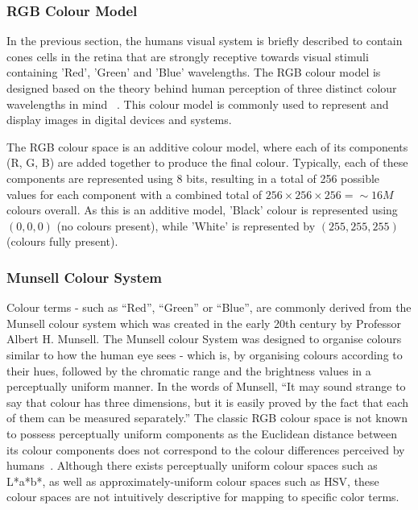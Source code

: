 \subsubsection{RGB Colour Model}
In the previous section, the humans visual system is briefly described to contain 
cones cells in the retina that are strongly receptive towards visual stimuli containing 'Red', 'Green' and 'Blue' wavelengths.
The RGB colour model is designed based on the theory behind human perception
of three distinct colour wavelengths in mind ~\cite{travis1991effective, young1802ii}. This colour model is commonly used to represent and display images in digital devices and systems.

The RGB colour space is an additive colour model, where each of its
components (R, G, B) are added together to produce the final colour. Typically, each of these components are represented using 8 bits, resulting in a total of 256 possible values
for each component with a combined total of $256 \times 256 \times 256 = \sim 16M$ colours overall. As this is an additive model, 'Black' colour is
represented using $(0, 0, 0)$ (no colours present), while 'White' is represented by $(255, 255, 255)$ (colours fully present). 



\subsubsection{Munsell Colour System}
\label{section:munsellcs}
Colour terms - such as ``Red'', ``Green'' or ``Blue'', are commonly derived from
the Munsell colour system which was created in the early 20th century by
Professor Albert H. Munsell. The Munsell colour System was designed to organise colours similar to how the human eye sees - which is, by
organising colours according to their hues, followed by the chromatic range
and the brightness values in a perceptually uniform manner. In the words of
Munsell, ``It may sound strange to say that colour has three dimensions, but it
is easily proved by the fact that each of them can be measured separately.''
The classic RGB colour space is not known to possess perceptually uniform components as the Euclidean distance between its colour components does not correspond to the colour differences perceived by humans~\cite{paschos2001perceptually}. Although there exists perceptually uniform colour spaces such as L*a*b*, as well as approximately-uniform colour spaces such as HSV, these colour spaces are not intuitively descriptive for mapping to specific color terms.

